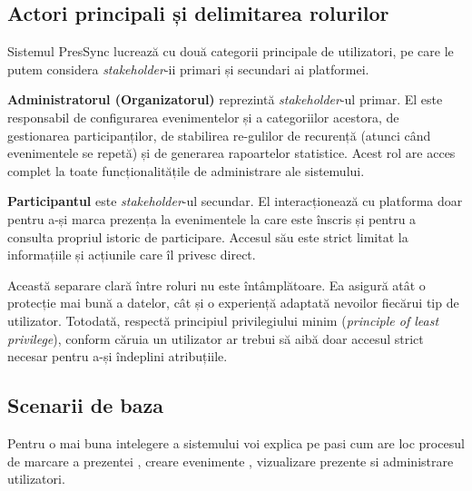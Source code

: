 \documentclass[11pt]{article}
\begin{document}
\subsection{Actori principali și delimitarea rolurilor}

    Sistemul PresSync lucrează cu două categorii principale de utilizatori, pe care le putem considera \textit{stakeholder}-ii primari și secundari ai platformei.

\textbf{Administratorul (Organizatorul)} reprezintă \textit{stakeholder}-ul primar. El este responsabil de configurarea evenimentelor și a categoriilor acestora, de gestionarea participanților, de stabilirea re-gulilor de recurență (atunci când evenimentele se repetă) și de generarea rapoartelor statistice. Acest rol are acces complet la toate funcționalitățile de administrare ale sistemului.

\textbf{Participantul} este \textit{stakeholder}-ul secundar. El interacționează cu platforma doar pentru a-și marca prezența la evenimentele la care este înscris și pentru a consulta propriul istoric de participare. Accesul său este strict limitat la informațiile și acțiunile care îl privesc direct.

Această separare clară între roluri nu este întâmplătoare. Ea asigură atât o protecție mai bună a datelor, cât și o experiență adaptată nevoilor fiecărui tip de utilizator. Totodată, respectă principiul privilegiului minim (\textit{principle of least privilege}), conform căruia un utilizator ar trebui să aibă doar accesul strict necesar pentru a-și îndeplini atribuțiile.
\subsection{Scenarii de baza}

Pentru o mai buna intelegere a sistemului voi explica pe pasi cum are loc procesul de marcare a prezentei , creare evenimente , vizualizare prezente si administrare utilizatori.
\end{document}
